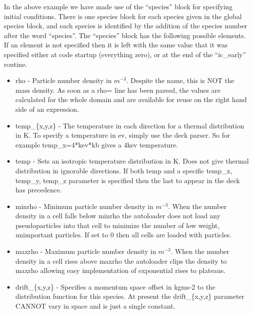 \documentclass[12pt,a4paper]{article}
\begin{document}
In the above example we have made use of the ``species'' block for specifying
initial conditions. There is one species block for each species given in
the global species block, and each species is identified by the addition of the
species number after the word ``species''.
The ``species'' block has the following possible elements. If an element
is not specified then it is left with the same value that it was specified
either at code startup (everything zero), or at the end of the ``ic\_early''
routine.\\
\begin{itemize}
\item rho - Particle number density in $m^{-3}$. Despite the name, this is
  NOT the mass density. As soon as a rho= line has been parsed, the values are
  calculated for the whole domain and are available for reuse on the right hand
  side of an expression.
\item temp\_\{x,y,z\} - The temperature in each direction for a thermal
  distribution in K. To specify a temperature in ev, simply use the deck
  parser. So for example temp\_x=4*kev*kb gives a 4kev temperature.
\item temp - Sets an isotropic temperature distribution in K. Does not give
  thermal distribution in ignorable directions. If both temp and a specific
  temp\_x, temp\_y, temp\_z parameter is specified then the last to appear in
  the deck has precedence.
\item minrho - Minimum particle number density in $m^{-3}$. When the number
  density in a cell falls below minrho the autoloader does not load any
  pseudoparticles into that cell to minimize the number of low weight,
  unimportant particles. If set to 0 then all cells are loaded with particles.
\item maxrho - Maximum particle number density in $m^{-3}$. When the number
  density in a cell rises above maxrho the autoloader clips the density to
  maxrho allowing easy implementation of exponential rises to plateaus.
\item drift\_\{x,y,z\} - Specifies a momentum space offset in kgms-2 to
  the distribution function for this species. At present the drift\_\{x,y,z\}
  parameter CANNOT vary in space and is just a single constant.
\end{itemize}
\end{document}

